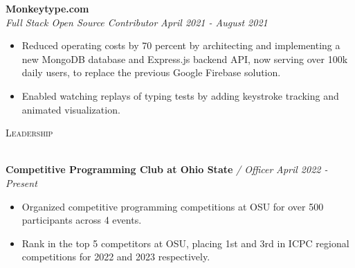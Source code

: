 \documentclass[letterpaper]{article}
\newcommand{\lineunder} {
    \vspace*{-8pt} \\
    \hspace*{-18pt} \hrulefill \\
}
\newcommand{\header} [1] {
    {\hspace*{-18pt}\vspace*{6pt} \textsc{#1}}
    \vspace*{-6pt} \lineunder
}
\begin{document}
    
    	\textbf{Monkeytype.com}\\
    
    \textit{Full Stack Open Source Contributor} \hfill \textsl{April 2021 - August 2021}\\
    \vspace{-7pt}
    \begin{itemize} \itemsep -1mm
            \item Reduced operating costs by 70 percent by architecting and implementing a new MongoDB database and Express.js backend API, now serving over 100k daily users, to replace the previous Google Firebase solution.

            \item Enabled watching replays of typing tests by adding keystroke tracking and animated visualization.
    
        
        
    \end{itemize}
    \vspace{-2mm}




\header{Leadership}
\vspace{1mm}


    \textbf{Competitive Programming Club at Ohio State} \textit{/ Officer} \hfill \textsl{April 2022 - Present}\\
    \vspace{-2mm}
    \begin{itemize} \itemsep -1pt
    
        \item Organized competitive programming competitions at OSU for over 500 participants across 4 events.
    
        \item Rank in the top 5 competitors at OSU, placing 1st and 3rd in ICPC regional competitions for 2022 and 2023 respectively.
    
    \end{itemize}
    \vspace{-1mm}
\end{document}
